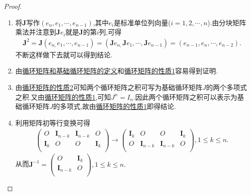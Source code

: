 \documentclass[lang=cn,newtx,10pt,scheme=chinese]{elegantbook}
\begin{document}
\begin{proof}
\begin{enumerate}
\item 将$\boldsymbol{J}$写作$(e_n,e_1,\cdots,e_{n-1})$,其中$e_i$是标准单位列向量($i=1,2,\cdots,n$).由分块矩阵乘法并注意到$\boldsymbol{J}e_i$就是$\boldsymbol{J}$的第$i$列,可得
\begin{align*}
\boldsymbol{J}^2=\boldsymbol{J}\left( e_{n,}e_1,\cdots ,e_{n-1} \right) =\left( \boldsymbol{J}e_{n,}\boldsymbol{J}e_1,\cdots ,\boldsymbol{J}e_{n-1} \right) =\left( e_{n-1},e_n,\cdots ,e_{n-2} \right) .
\end{align*}
不断这样做下去就可以得到结论.
\item 由\hyperref[definition:循环矩阵]{循环矩阵和基础循环矩阵的定义}和\hyperref[proposition:循环矩阵的性质]{循环矩阵的性质1}容易得到证明.
\item 由\hyperref[proposition:循环矩阵的性质]{循环矩阵的性质2}可知两个循环矩阵之积可写为基础循环矩阵$J$的两个多项式之积.又由\hyperref[proposition:循环矩阵的性质]{循环矩阵的性质1},可知$J^n=I_n$.因此两个循环矩阵之积可以表示为基础循环矩阵$J$的多项式,故由\hyperref[proposition:循环矩阵的性质]{循环矩阵的性质1}即得结论.
\item 利用矩阵初等行变换可得
\begin{align*}
\left( \begin{matrix}
O&		\boldsymbol{I}_{n-k}&		\boldsymbol{I}_{n-k}&		O\\
\boldsymbol{I}_k&		O&		O&		\boldsymbol{I}_k\\
\end{matrix} \right) \rightarrow \left( \begin{matrix}
\boldsymbol{I}_k&		O&		O&		\boldsymbol{I}_k\\
O&		\boldsymbol{I}_{n-k}&		\boldsymbol{I}_{n-k}&		O\\
\end{matrix} \right) ,1\le k\le n.
\end{align*}
从而$\boldsymbol{J}^{-1}=\left( \begin{matrix}
O&		\boldsymbol{I}_k\\
\boldsymbol{I}_{n-k}&		O\\
\end{matrix} \right) ,1\le k\le n.$
\end{enumerate}
\end{proof}
\end{document}
